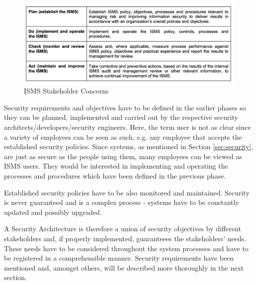 \begin{figure}[H]
\centering
\includegraphics[width=\textwidth]{pictures/isms_concerns.png}
\caption{ISMS Stakeholder Concerns}
\label{fig:isms_stakeholder}
\end{figure}

Security requirements and objectives have to be defined in the earlier phases so they can be planned, implemented and carried out by the respective security architects/developers/security engineers. Here, the term user is not as clear since a variety of employees can be seen as such, e.g. any employee that accepts the established security policies. Since systems, as mentioned in Section \ref{sec:security}, are just as secure as the people using them, many employees can be viewed as ISMS users. They would be interested in implementing and operating the processes and procedures which have been defined in the previous phase.

Established security policies have to be also monitored and maintained. Security is never guaranteed and is a complex process \cite{vacca2012computer} - systems have to be constantly updated and possibly upgraded. 

A Security Architecture is therefore a union of security objectives by different stakeholders and, if properly implemented, guaranteees the stakeholders' needs.
These needs have to be considered throughout the system processes and have to be registered in a comprehensible manner. Security requirements have been mentioned and, amongst others, will be described more thoroughly in the next section.

